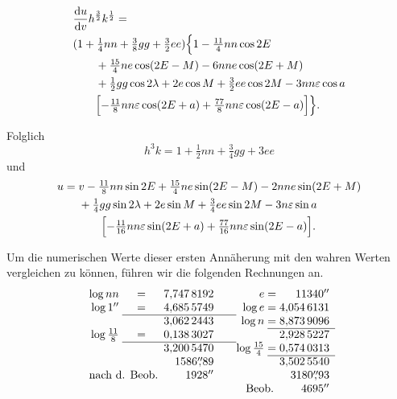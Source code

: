 \[
\begin{aligned}
 &\frac{\mathrm{d}u}{\mathrm{d}v}h^{\frac32}k^{\frac12}=\\
 &(1+\tfrac14nn+\tfrac38gg+\tfrac32ee)
       \Bigl\{1-\tfrac{11}{4}nn\cos2E\\
 &\qquad+\tfrac{15}{4}ne\cos(2E-M)-6nne\cos(2E+M)\\
 &\qquad+\tfrac12gg\cos2\lambda+2e\cos M
                         +\tfrac32ee\cos2M-3nn\varepsilon\cos a\\
 &\qquad\Bigl[-\tfrac{11}{8}nn\varepsilon\cos(2E+a)
                         +\tfrac{77}{8}nn\varepsilon\cos(2E-a)\Bigr]\Bigr\}.
\end{aligned}
\]
\par\noindent\hspace*{\parindent}Folglich
\[
 h^3k=1+\tfrac12nn+\tfrac34gg+3ee
\]
\noindent und
\[
\begin{aligned}
 u={}&v-\tfrac{11}{8}nn\sin2E+\tfrac{15}{4}ne\sin(2E-M)-2nne\sin(2E+M)\\
 &+\tfrac14gg\sin2\lambda+2e\sin M+\tfrac34ee\sin2M-3n\varepsilon\sin a\\
 &\qquad\Bigl[-\tfrac{11}{16}nn\varepsilon\sin(2E+a)
                    +\tfrac{77}{16}nn\varepsilon\sin(2E-a)\Bigr].
\end{aligned}
\]
\par\noindent\hspace*{\parindent}Um die numerischen Werte dieser ersten
Annäherung mit den wahren Werten vergleichen zu können, führen wir die folgenden
Rechnungen an.
\[
\begin{array}{r@{\;}c@{\;}r@{\qquad}r@{\;}c@{\;}r}
 \log nn&=&7{,}747\,8192 &e&=&11340^{\prime\prime}\\
 \log1^{\prime\prime}&=&4{,}685\,5749 &\log e&=&4{,}054\,6131\\ \cline{2-3}
 &&3{,}062\,2443 &\log n&=&8{,}873\,9096\\ \cline{5-6}
 \log\frac{11}{8}&=&0{,}138\,3027 &&&2{,}928\,5227\\ \cline{2-3}
 &&3{,}200\,5470 &\log\frac{15}{4}&=&0{,}574\,0313\\ \cline{5-6}
 &&1586\overset{\prime\prime}{,}89 &&&3{,}502\,5540\\
 \multicolumn{2}{r}{\text{nach d. Beob.}}&1928^{\prime\prime}
                  &&&3180\overset{\prime\prime}{,}93\\
 &&&\multicolumn{2}{r}{\text{Beob.}}&4695^{\prime\prime}
\end{array}
\]
